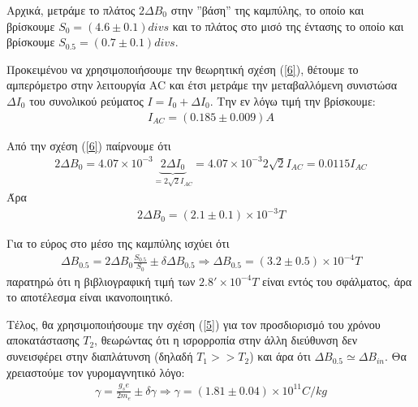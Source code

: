 \documentclass[a4paper]{article}
\begin{document}
		Αρχικά, μετράμε το πλάτος $2\Delta B_0$ στην ''βάση'' της καμπύλης,  το οποίο και βρίσκουμε $S_0 = (4.6\pm0.1)divs$ και το πλάτος στο μισό της έντασης το οποίο και βρίσκουμε $S_{0.5} = (0.7\pm0.1)divs$. 
		
		Προκειμένου να χρησιμοποιήσουμε την θεωρητική σχέση (\ref{6}), θέτουμε το αμπερόμετρο στην λειτουργία AC και έτσι μετράμε την μεταβαλλόμενη συνιστώσα $\Delta I_0$ του συνολικού ρεύματος $I = I_0 + \Delta I_0$. Την εν λόγω τιμή την βρίσκουμε: \footnotemark
		\begin{align*}
			I_{AC} = (0.185 \pm 0.009) A
		\end{align*}
	
	Από την σχέση (\ref{6}) παίρνουμε ότι 
		\begin{align*}
			2\Delta B_0 = 4.07 \times10^{-3} \underbrace{2\Delta I_0}_{=2\sqrt{2}I_{AC}} = 4.07\times10^{-3}2\sqrt{2}I_{AC}=0.0115I_{AC}
		\end{align*}
	Άρα \footnotemark
		\begin{align*}
			2\Delta B_0 = (2.1\pm 0.1)\times10^{-3} T
		\end{align*}
	
	Για το εύρος στο μέσο της καμπύλης ισχύει ότι\footnotemark
		\begin{align*}
			\Delta B_{0.5} = 2\Delta B_{0} \frac{S_{0.5}}{S_0} \pm \delta\Delta B_{0.5} \Rightarrow \boxed{\Delta B_{0.5} =(3.2\pm 0.5)\times10^{-4} T}
		\end{align*}
		παρατηρώ ότι η βιβλιογραφική τιμή των $2.8'\times10^{-4}T$ είναι εντός του σφάλματος, άρα το αποτέλεσμα είναι ικανοποιητικό.
		
		Τέλος, θα χρησιμοποιήσουμε την σχέση (\ref{5}) για τον προσδιορισμό του χρόνου αποκατάστασης $T_2$, θεωρώντας ότι η ισρορροπία στην άλλη διεύθυνση δεν συνεισφέρει στην διαπλάτυνση (δηλαδή $T_1>> T_2$) και άρα ότι $\Delta B_{0.5}\simeq\Delta B_{in}$.
		Θα χρειαστούμε τον γυρομαγνητικό λόγο\footnotemark:
			\begin{align*}
				\gamma = \frac{g_s e}{2m_e} \pm \delta\gamma \Rightarrow \boxed{\gamma = (1.81 \pm 0.04)\times10^{11} C/kg }
			\end{align*}					
		
\end{document}
